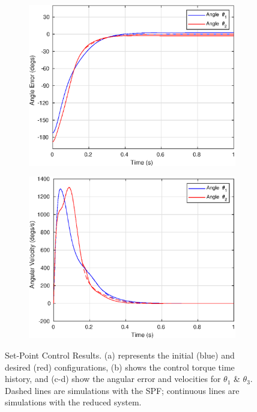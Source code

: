 \documentclass[10pt,final,journal,letterpaper,oneside,twocolumn]{IEEEtran}
\newcounter{mytempcntr}
\begin{document}
\begin{figure}[!h]
  \begin{subfigure}[!t]{0.5\linewidth}
    \centering
    \includegraphics[width=0.7\linewidth]{./FIGS/SETPT_1}
    \caption{}
    \label{fig:setpt1}
  \end{subfigure}%
  \begin{subfigure}[!t]{0.5\linewidth}
    \centering
    \includegraphics[width=0.7\linewidth]{./FIGS/SETPT_2}
    \caption{}
    \label{fig:setpt2}
  \end{subfigure}
  \caption{Set-Point Control Results. (a) represents the initial
    (blue) and desired (red) configurations, (b) shows the control
    torque time history, and (c-d) show the angular error and
    velocities for $\theta_1$ \& $\theta_3$. Dashed lines are
    simulations with the SPF; continuous lines are simulations with
    the reduced system.}
  \label{fig:setpoint}
\end{figure}
\end{document}
